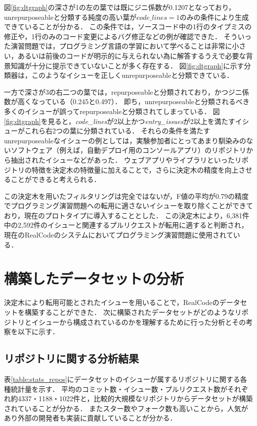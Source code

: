 図\ref{fig:dtgraph}の深さが1の左の葉では既にジニ係数が0.1207となっており，unrepurposeableと分類する純度の高い葉が$\textit{code\_lines}=1$のみの条件により生成できていることが分かる．
この条件では，ソースコード中の1行のタイプミスの修正や，1行のみのコード変更によるバグ修正などの例が確認できた．
そういった演習問題では，プログラミング言語の学習において学べることは非常に小さい，あるいは前後のコードが明示的に与えられない為に解答するうえで必要な背景知識が十分に提示できていないことが多く存在する．
図\ref{fig:dtgraph}に示す分類器は，このようなイシューを正しくunrepurposeableと分類できている．

一方で深さが3の右二つの葉では，repurposeableと分類されており，かつジニ係数が高くなっている（0.245と0.497）．
即ち，unrepurposeableと分類されるべき多くのイシューが誤ってrepurposeableと分類されてしまっている．
図\ref{fig:dtgraph}を見ると，\textit{code\_lines}が2以上かつ\textit{entry\_issues}が2以上を満たすイシューがこれら右2つの葉に分類されている．
それらの条件を満たすunrepurposeableなイシューの例としては，実験参加者にとってあまり馴染みのないソフトウェア（例えば，自動デプロイ用のコンソールアプリ）のリポジトリから抽出されたイシューなどがあった．
ウェブアプリやライブラリといったリポジトリの特徴を決定木の特徴量に加えることで，さらに決定木の精度を向上させることができると考えられる．

この決定木を用いたフィルタリングは完全ではないが，F値の平均が0.79の精度でプログラミング演習問題への転用に適さないイシューを取り除くことができており，現在のプロトタイプに導入することとした．
この決定木により，6,381件中の2,592件のイシューと関連するプルリクエストが転用に適すると判断され，現在のRealCodeのシステムにおいてプログラミング演習問題に使用されている．



\section{構築したデータセットの分析}
決定木により転用可能とされたイシューを用いることで，RealCodeのデータセットを構築することができた．
次に構築されたデータセットがどのようなリポジトリとイシューから構成されているのかを理解するために行った分析とその考察を以下に示す．

\subsection{リポジトリに関する分析結果}

表\ref{table:stats_repos}にデータセットのイシューが属するリポジトリに関する各種統計量を示す．
平均のコミット数・イシュー数・プルリクエスト数がそれぞれ約4337・1188・1022件と，比較的大規模なリポジトリからデータセットが構築されていることが分かる．
またスター数やフォーク数も高いことから，人気があり外部の開発者も実装に貢献していることが分かる．

